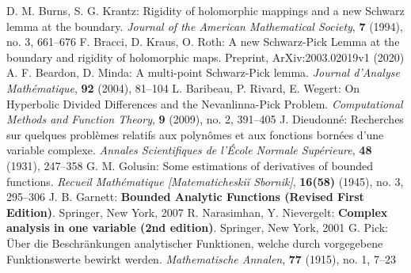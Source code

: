 \begin{thebibliography}{widest entry}
   D. M. Burns, S. G. Krantz: Rigidity of holomorphic mappings and a new Schwarz lemma at the boundary. \textit{Journal of the American Mathematical Society}, \textbf{7} (1994), no. 3, 661--676
   F. Bracci, D. Kraus, O. Roth: A new Schwarz-Pick Lemma at the boundary and rigidity of holomorphic maps. Preprint, ArXiv:2003.02019v1 (2020)
   A. F. Beardon, D. Minda: A multi-point Schwarz-Pick lemma. \textit{Journal d'Analyse Mathématique}, \textbf{92} (2004), 81--104
   L. Baribeau, P. Rivard, E. Wegert: On Hyperbolic Divided Differences and the Nevanlinna-Pick Problem. \textit{ Computational Methods and Function Theory}, \textbf{9} (2009), no. 2, 391--405
   J. Dieudonné: Recherches sur quelques problèmes relatifs aux polynômes et aux fonctions bornées d'une variable complexe. \textit{Annales Scientifiques de l'École Normale Supérieure}, \textbf{48} (1931), 247--358
   G. M. Golusin: Some estimations of derivatives of bounded functions. \textit{Recueil Mathématique [Matematicheskiĭ Sbornik]}, \textbf{16(58)} (1945), no. 3, 295--306
   J. B. Garnett: \textbf{Bounded Analytic Functions (Revised First Edition)}. Springer, New York, 2007
   R. Narasimhan, Y. Nievergelt: \textbf{Complex analysis in one variable (2nd edition)}. Springer, New York, 2001
   G. Pick: Über die Beschränkungen analytischer Funktionen, welche durch vorgegebene Funktionswerte bewirkt werden. \textit{ Mathematische Annalen}, \textbf{77} (1915), no. 1, 7--23
\end{thebibliography}

